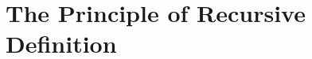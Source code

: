 \documentclass[../main.tex]{subfiles}
\begin{document}
\section{The Principle of Recursive Definition}
%
\todo{}
\end{document}
